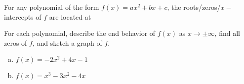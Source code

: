 \documentclass[notes]{subfiles}
\begin{document}
		
		\begin{rmk}
			For any polynomial of the form \(f(x) = ax^2 + bx + c\), the roots/zeros/\(x-\)intercepts of \(f\) are located at\\[75pt]
		\end{rmk}
		
		\begin{ex}
			For each polynomial, describe the end behavior of \(f(x)\) as \(x\to \pm \infty\), find all zeros of \(f\), and sketch a graph of \(f\).
			\begin{enumerate}[(a)]
				\item \(f(x) = -2x^2+4x-1\)
					
				\item \(f(x) = x^3-3x^2-4x\)
			\end{enumerate}
		\end{ex}	
			\newpage
			
		
\clearpage
\end{document}
